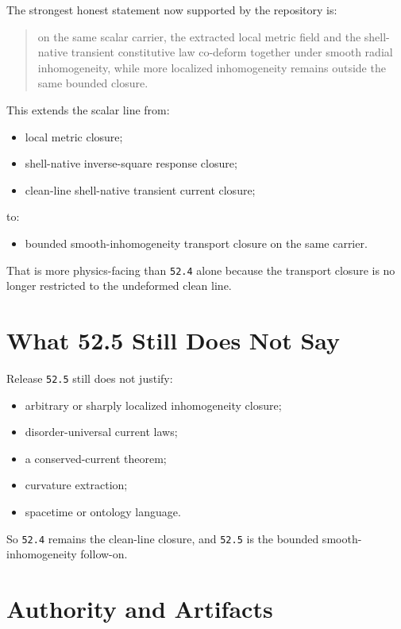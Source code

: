 \documentclass[11pt]{article}
\begin{document}
The strongest honest statement now supported by the repository is:

\begin{quote}
on the same scalar carrier, the extracted local metric field and the shell-native transient constitutive law co-deform together under smooth radial inhomogeneity, while more localized inhomogeneity remains outside the same bounded closure.
\end{quote}

This extends the scalar line from:
\begin{itemize}
\item local metric closure;
\item shell-native inverse-square response closure;
\item clean-line shell-native transient current closure;
\end{itemize}
to:
\begin{itemize}
\item bounded smooth-inhomogeneity transport closure on the same carrier.
\end{itemize}

That is more physics-facing than \texttt{52.4} alone because the transport closure is no longer restricted to the undeformed clean line.

\section{What 52.5 Still Does Not Say}

Release \texttt{52.5} still does not justify:
\begin{itemize}
\item arbitrary or sharply localized inhomogeneity closure;
\item disorder-universal current laws;
\item a conserved-current theorem;
\item curvature extraction;
\item spacetime or ontology language.
\end{itemize}

So \texttt{52.4} remains the clean-line closure, and \texttt{52.5} is the bounded smooth-inhomogeneity follow-on.

\section{Authority and Artifacts}
\end{document}
